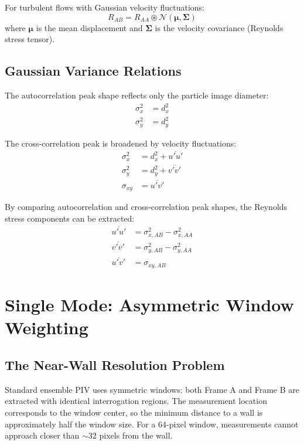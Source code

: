 \documentclass[11pt,a4paper]{article}
\begin{document}
For turbulent flows with Gaussian velocity fluctuations:
\begin{equation}
    R_{AB} = R_{AA} \circledast \mathcal{N}(\boldsymbol{\mu}, \boldsymbol{\Sigma})
\end{equation}
where $\boldsymbol{\mu}$ is the mean displacement and $\boldsymbol{\Sigma}$ is the velocity covariance (Reynolds stress tensor).

\subsection{Gaussian Variance Relations}

The autocorrelation peak shape reflects only the particle image diameter:
\begin{align}
    \sigma_x^2 &= d_x^2 \\
    \sigma_y^2 &= d_y^2
\end{align}

The cross-correlation peak is broadened by velocity fluctuations:
\begin{align}
    \sigma_x^2 &= d_x^2 + \overline{u'u'} \\
    \sigma_y^2 &= d_y^2 + \overline{v'v'} \\
    \sigma_{xy} &= \overline{u'v'}
\end{align}

By comparing autocorrelation and cross-correlation peak shapes, the Reynolds stress components can be extracted:
\begin{align}
    \overline{u'u'} &= \sigma_{x,AB}^2 - \sigma_{x,AA}^2 \\
    \overline{v'v'} &= \sigma_{y,AB}^2 - \sigma_{y,AA}^2 \\
    \overline{u'v'} &= \sigma_{xy,AB}
\end{align}

\section{Single Mode: Asymmetric Window Weighting}

\subsection{The Near-Wall Resolution Problem}

Standard ensemble PIV uses symmetric windows: both Frame A and Frame B are extracted with identical interrogation regions. The measurement location corresponds to the window center, so the minimum distance to a wall is approximately half the window size. For a 64-pixel window, measurements cannot approach closer than $\sim$32 pixels from the wall.
\end{document}
